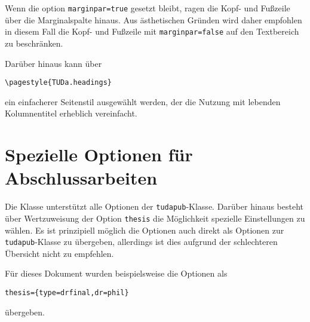 \documentclass[
	ngerman,
	ruledheaders=section,%
	class=report,%
	thesis={type=bachelor},%
	accentcolor=9c,%
	custommargins=true,%
	marginpar=false,%
	parskip=half-,%
	fontsize=11pt,%
]{tudapub}
\let\file\texttt
\let\code\texttt
\begin{document}
Wenn die option \code{marginpar=true} gesetzt bleibt, ragen die Kopf- und Fußzeile über die Marginalspalte hinaus. Aus ästhetischen Gründen wird daher empfohlen in diesem Fall die Kopf- und Fußzeile  mit \code{marginpar=false}  auf den Textbereich zu beschränken.


Darüber hinaus kann über
\begin{verbatim}
\pagestyle{TUDa.headings}
\end{verbatim}
ein einfacherer Seitenstil ausgewählt werden, der die Nutzung mit lebenden Kolumnentitel erheblich vereinfacht.


\section{Spezielle Optionen für Abschlussarbeiten}
Die Klasse unterstützt alle Optionen der \file{tudapub}-Klasse. Darüber hinaus besteht über Wertzuweisung der Option \code{thesis} die Möglichkeit spezielle Einstellungen zu wählen.
Es ist prinzipiell möglich die Optionen auch direkt als Optionen zur \file{tudapub}-Klasse zu übergeben, allerdings ist dies aufgrund der schlechteren Übersicht nicht zu empfehlen.

Für dieses Dokument wurden beispielsweise die Optionen als
\begin{verbatim}
thesis={type=drfinal,dr=phil}
\end{verbatim}
übergeben.
\end{document}
